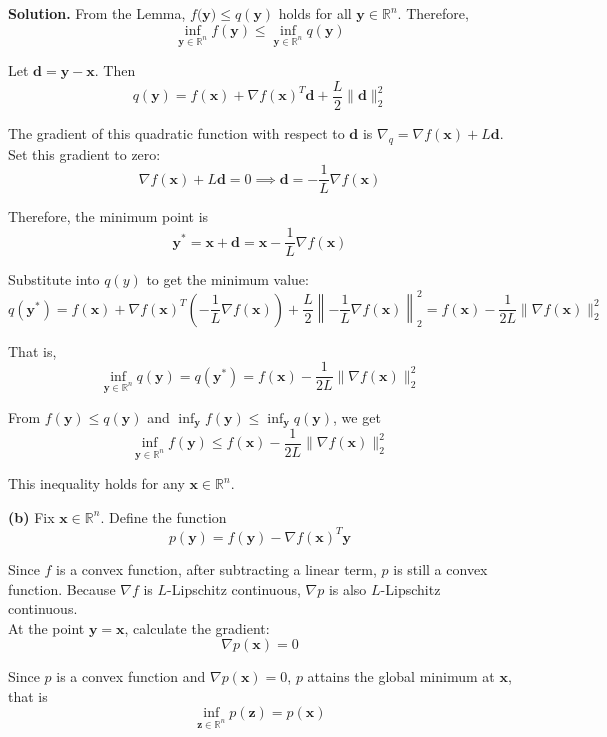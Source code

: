 \documentclass[12pt, a4paper, oneside]{ctexart}
\newenvironment{solution}{\par\noindent\textbf{Solution. }}{\par}
\begin{document}
\begin{solution}
From the Lemma, $ f\mathbf{(y})\leq q(\mathbf{y}) $ holds for all $ \mathbf{y} \in \mathbb{R}^n $. Therefore,
$$
\inf_{\mathbf{y} \in \mathbb{R}^n}f(\mathbf{y})\leq\inf_{\mathbf{y} \in \mathbb{R}^n}q(\mathbf{y})
$$

Let $ \mathbf{d} = \mathbf{y} - \mathbf{x} $. Then
$$
q(\mathbf{y})=f(\mathbf{x})+\nabla f(\mathbf{x})^T \mathbf{d}+\frac{L}{2}\|\mathbf{d}\|_2^2
$$

The gradient of this quadratic function with respect to $ \mathbf{d} $ is $ \nabla_q = \nabla f(\mathbf{x})+L\mathbf{d} $. Set this gradient to zero:
$$
\nabla f(\mathbf{x})+L\mathbf{d} = 0\implies \mathbf{d} = -\frac{1}{L}\nabla f(\mathbf{x})
$$

Therefore, the minimum point is
$$
\mathbf{y}^*=\mathbf{x} + \mathbf{d}=\mathbf{x}-\frac{1}{L}\nabla f(\mathbf{x})
$$

Substitute into $ q(y) $ to get the minimum value:
$$
q(\mathbf{y}^*)=f(\mathbf{x})+\nabla f(\mathbf{x})^T\left(-\frac{1}{L}\nabla f(\mathbf{x})\right)+\frac{L}{2}\left\|-\frac{1}{L}\nabla f(\mathbf{x})\right\|_2^2=f(\mathbf{x})-\frac{1}{2L}\|\nabla f(\mathbf{x})\|_2^2
$$

That is,
$$
\inf_{\mathbf{y} \in \mathbb{R}^n}q(\mathbf{y})=q(\mathbf{y}^*)=f(\mathbf{x})-\frac{1}{2L}\|\nabla f(\mathbf{x})\|_2^2
$$

From $ f(\mathbf{y})\leq q(\mathbf{y}) $ and $ \inf_{\mathbf{y}}f(\mathbf{y})\leq\inf_{\mathbf{y}}q(\mathbf{y}) $, we get
$$
\inf_{\mathbf{y} \in \mathbb{R}^n}f(\mathbf{y})\leq f(\mathbf{x})-\frac{1}{2L}\|\nabla f(\mathbf{x})\|_2^2
$$

This inequality holds for any $ \mathbf{x} \in \mathbb{R}^n $. 

\vspace{12pt}

\textbf{(b)}
Fix $ \mathbf{x} \in \mathbb{R}^n $. Define the function
$$
p(\mathbf{y})=f(\mathbf{y})-\nabla f(\mathbf{x})^T \mathbf{y}
$$

Since $ f $ is a convex function, after subtracting a linear term, $ p $ is still a convex function.
Because $ \nabla f $ is $ L $-Lipschitz continuous, $ \nabla p $ is also $ L $-Lipschitz continuous.
\\
At the point $ \mathbf{y} = \mathbf{x} $, calculate the gradient:
$$
\nabla p(\mathbf{x})=0
$$

Since $ p $ is a convex function and $ \nabla p(\mathbf{x}) = 0 $, $ p $ attains the global minimum at $ \mathbf{x} $, that is
$$
\inf_{\mathbf{z} \in \mathbb{R}^n}p(\mathbf{z})=p(\mathbf{x})
$$


\end{solution}
\end{document}
